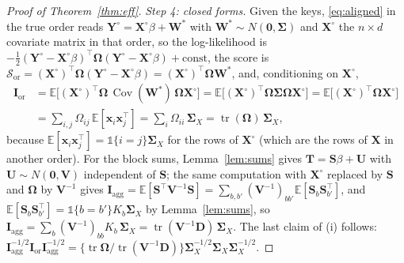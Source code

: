 \documentclass[11pt]{article}
\theoremstyle{definition}
\newcommand{\bX}{\mathbf{X}}
\newcommand{\bx}{\bm{x}}\newcommand{\bg}{\bm{g}}\newcommand{\bw}{\bm{w}}\newcommand{\bz}{\bm{z}}
\newcommand{\bY}{\mathbf{Y}}
\newcommand{\bW}{\mathbf{W}}
\newcommand{\bS}{\mathbf{S}}
\newcommand{\bT}{\mathbf{T}}
\newcommand{\bU}{\mathbf{U}}
\newcommand{\bV}{\mathbf{V}}
\newcommand{\bD}{\mathbf{D}}
\newcommand{\bzero}{\mathbf{0}}
\newcommand{\bSig}{\boldsymbol{\Sigma}}
\newcommand{\bOm}{\boldsymbol{\Omega}}
\newcommand{\E}{\mathbb{E}}
\newcommand{\Cov}{\operatorname{Cov}}
\newcommand{\tr}{\operatorname{tr}}
\newcommand{\agg}{\mathrm{agg}}
\newcommand{\orc}{\mathrm{or}}
\begin{document}
\begin{proof}[Proof of Theorem~\ref{thm:eff}]
\emph{Step 4: closed forms.} Given the keys, \eqref{eq:aligned} in the true order reads $\bY^\circ=\bX^\circ\beta+\bW^\ast$ with $\bW^\ast\sim N(\bzero,\bSig)$ and $\bX^\circ$ the $n\times d$ covariate matrix in that order, so the log-likelihood is $-\tfrac12(\bY^\circ-\bX^\circ\beta)^\top\bOm(\bY^\circ-\bX^\circ\beta)+\text{const}$, the score is $\bm{\mathcal S}_\orc=(\bX^\circ)^\top\bOm(\bY^\circ-\bX^\circ\beta)=(\bX^\circ)^\top\bOm\bW^\ast$, and, conditioning on $\bX^\circ$,
\begin{align*}
\mathbf I_\orc&=\E\big[(\bX^\circ)^\top\bOm\,\Cov(\bW^\ast)\,\bOm\bX^\circ\big]=\E\big[(\bX^\circ)^\top\bOm\bSig\bOm\bX^\circ\big]=\E\big[(\bX^\circ)^\top\bOm\bX^\circ\big]\\
&=\sum_{i,j}\Omega_{ij}\,\E[\bx_i\bx_j^\top]=\sum_i\Omega_{ii}\,\bSig_X=\tr(\bOm)\,\bSig_X,
\end{align*}
because $\E[\bx_i\bx_j^\top]=\mathbb 1\{i=j\}\bSig_X$ for the rows of $\bX^\circ$ (which are the rows of $\bX$ in another order). For the block sums, Lemma~\ref{lem:sums} gives $\bT=\mathbf S\beta+\bU$ with $\bU\sim N(\bzero,\bV)$ independent of $\mathbf S$; the same computation with $\bX^\circ$ replaced by $\mathbf S$ and $\bOm$ by $\bV^{-1}$ gives $\mathbf I_\agg=\E[\mathbf S^\top\bV^{-1}\mathbf S]=\sum_{b,b'}(\bV^{-1})_{bb'}\E[\bS_b\bS_{b'}^\top]$, and $\E[\bS_b\bS_{b'}^\top]=\mathbb 1\{b=b'\}K_b\bSig_X$ by Lemma~\ref{lem:sums}, so $\mathbf I_\agg=\sum_b(\bV^{-1})_{bb}K_b\,\bSig_X=\tr(\bV^{-1}\bD)\,\bSig_X$. The last claim of (i) follows: $\mathbf I_\agg^{-1/2}\mathbf I_\orc\mathbf I_\agg^{-1/2}=\{\tr\bOm/\tr(\bV^{-1}\bD)\}\bSig_X^{-1/2}\bSig_X\bSig_X^{-1/2}$.


\end{proof}
\end{document}
